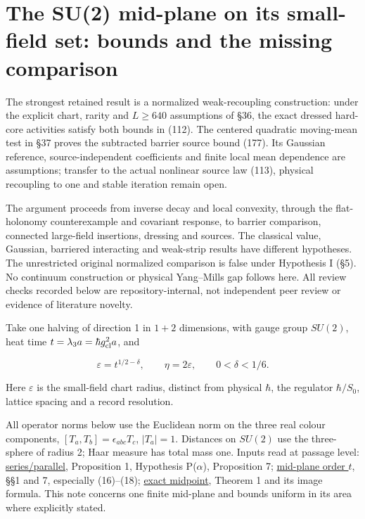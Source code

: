 \documentclass[11pt,a4paper]{article}
\begin{document}
\hypertarget{the-su2-mid-plane-on-its-small-field-set-bounds-and-the-missing-comparison}{%
\section{The SU(2) mid-plane on its small-field set: bounds and the
missing
comparison}\label{the-su2-mid-plane-on-its-small-field-set-bounds-and-the-missing-comparison}}

The strongest retained result is a normalized weak-recoupling
construction: under the explicit chart, rarity and \(L\ge640\)
assumptions of §36, the exact dressed hard-core activities satisfy both
bounds in (112). The centered quadratic moving-mean test in §37 proves
the subtracted barrier source bound (177). Its Gaussian reference,
source-independent coefficients and finite local mean dependence are
assumptions; transfer to the actual nonlinear source law (113), physical
recoupling to one and stable iteration remain open.

The argument proceeds from inverse decay and local convexity, through
the flat-holonomy counterexample and covariant response, to barrier
comparison, connected large-field insertions, dressing and sources. The
classical value, Gaussian, barriered interacting and weak-strip results
have different hypotheses. The unrestricted original normalized
comparison is false under Hypothesis I (§5). No continuum construction
or physical Yang--Mills gap follows here. All review checks recorded
below are repository-internal, not independent peer review or evidence
of literature novelty.

Take one halving of direction 1 in \(1+2\) dimensions, with gauge group
\(SU(2)\), heat time \(t=\lambda_3a=\hbar g_{\rm cl}^2a\), and

\[\varepsilon=t^{1/2-\delta},\qquad \eta=2\varepsilon,
\qquad 0<\delta<1/6.\]

Here \(\varepsilon\) is the small-field chart radius, distinct from
physical \(\hbar\), the regulator \(\hbar/S_0\), lattice spacing and a
record resolution.

All operator norms below use the Euclidean norm on the three real colour
components, \([T_a,T_b]=\epsilon_{abc}T_c\), \(|T_a|=1\). Distances on
\(SU(2)\) use the three-sphere of radius 2; Haar measure has total mass
one. Inputs read at passage level:
\href{series-parallel-gauge-refinement.md}{series/parallel}, Proposition
1, Hypothesis P(\(\alpha\)), Proposition 7;
\href{su2-midplane-order-t.md}{mid-plane order \(t\)}, §§1 and 7,
especially (16)--(18); \href{su2-midpoint-exact.md}{exact midpoint},
Theorem 1 and its image formula. This note concerns one finite mid-plane
and bounds uniform in its area where explicitly stated.
\end{document}
